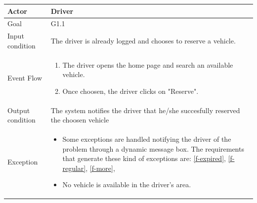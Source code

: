 
\begin{table}[H]
	\begin{center}
		\begin{tabular}{| l | p{} |}
			\hline
			Actor & Driver \\
			\hline
			Goal & G1.1
			\\
			\hline
			Input condition & The driver is already logged and chooses to reserve a vehicle.  \\
			\hline
			Event Flow & \begin{enumerate}
				\item The driver opens the home page and search an available vehicle.
				\item Once choosen, the driver clicks on "Reserve".
			\end{enumerate}
			\\
			\hline
			Output condition & The system notifies the driver that he/she succesfully reserved the choosen vehicle \\
			\hline
			
			Exception &  \begin{itemize}
				\item Some exceptions are handled notifying the driver of the problem through a dynamic message box.				
				The requirements that generate these kind of exceptions are:
				\ref{f-expired},    %
				\ref{f-regular},    %
				\ref{f-more},       %
				\item No vehicle is available in the driver's area.
				\end{itemize}
			\\
			\hline
		\end{tabular}
	\end{center}
\end{table}

